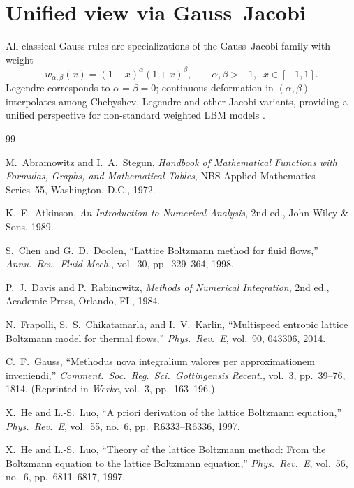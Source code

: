 \documentclass[11pt,a4paper]{article}
\theoremstyle{definition}
\begin{document}
\section{Unified view via Gauss--Jacobi}\label{app:jacobi}

All classical Gauss rules are specializations of the Gauss--Jacobi family with
weight
\[
  w_{\alpha,\beta}(x)=(1-x)^\alpha(1+x)^\beta,
  \qquad \alpha,\beta>-1,\;\;x\in[-1,1].
\]
Legendre corresponds to $\alpha=\beta=0$; continuous deformation in
$(\alpha,\beta)$ interpolates among Chebyshev, Legendre and other Jacobi
variants, providing a unified perspective for non-standard weighted LBM models
\cite[Ch.~4]{Szego1975}.

\begin{thebibliography}{99}\small

M.~Abramowitz and I.~A.~Stegun,
\emph{Handbook of Mathematical Functions with Formulas, Graphs, and
Mathematical Tables},
NBS Applied Mathematics Series~55, Washington, D.C., 1972.

K.~E.~Atkinson,
\emph{An Introduction to Numerical Analysis}, 2nd ed.,
John Wiley \& Sons, 1989.

S.~Chen and G.~D.~Doolen,
``Lattice Boltzmann method for fluid flows,''
\emph{Annu.\ Rev.\ Fluid Mech.}, vol.~30, pp.~329--364, 1998.

P.~J.~Davis and P.~Rabinowitz,
\emph{Methods of Numerical Integration}, 2nd ed.,
Academic Press, Orlando, FL, 1984.

N.~Frapolli, S.~S.~Chikatamarla, and I.~V.~Karlin,
``Multispeed entropic lattice Boltzmann model for thermal flows,''
\emph{Phys.\ Rev.\ E}, vol.~90, 043306, 2014.

C.~F.~Gauss,
``Methodus nova integralium valores per approximationem inveniendi,''
\emph{Comment.\ Soc.\ Reg.\ Sci.\ Gottingensis Recent.}, vol.~3, pp.~39--76,
1814. (Reprinted in \emph{Werke}, vol.~3, pp.~163--196.)

X.~He and L.-S.~Luo,
``A priori derivation of the lattice Boltzmann equation,''
\emph{Phys.\ Rev.\ E}, vol.~55, no.~6, pp.~R6333--R6336, 1997.

X.~He and L.-S.~Luo,
``Theory of the lattice Boltzmann method: From the Boltzmann equation to the
lattice Boltzmann equation,''
\emph{Phys.\ Rev.\ E}, vol.~56, no.~6, pp.~6811--6817, 1997.


\end{thebibliography}
\end{document}

